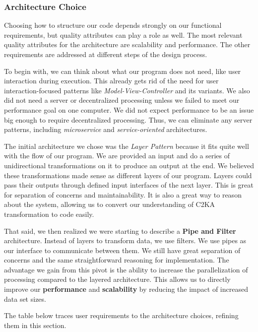 \newpage
\subsubsection{Architecture Choice}
Choosing how to structure our code depends strongly on our functional requirements,
but quality attributes can play a role as well.
The most relevant quality attributes for the architecture are scalability and performance.
The other requirements are addressed at different steps of the design process.

To begin with, we can think about what our program does not need, like user interaction during execution.
This already gets rid of the need for user interaction-focused patterns like \textit{Model-View-Controller} and its variants.
We also did not need a server or decentralized processing unless we failed to meet our performance goal on one computer.
We did not expect performance to be an issue big enough to require decentralized processing.
Thus, we can eliminate any server patterns, including \textit{microservice} and \textit{service-oriented} architectures.

The initial architecture we chose was the \textit{Layer Pattern} because it fits quite well with the flow of our program.
We are provided an input and do a series of unidirectional transformations on it to produce an output at the end.
We believed these transformations made sense as different layers of our program.
Layers could pass their outputs through defined input interfaces of the next layer.
This is great for separation of concerns and maintainability.
It is also a great way to reason about the system, allowing us to convert our understanding of C2KA transformation to code easily.

That said, we then realized we were starting to describe a \textbf{Pipe and Filter} architecture.
Instead of layers to transform data, we use filters.
We use pipes as our interface to communicate between them.
We still have great separation of concerns and the same straightforward reasoning for implementation.
The advantage we gain from this pivot is the ability to increase the parallelization of processing compared to the layered architecture.
This allows us to directly improve our \textbf{performance} and \textbf{scalability} by reducing the impact of increased data set sizes.

The table below traces user requirements to the architecture choices, refining them in this section.

